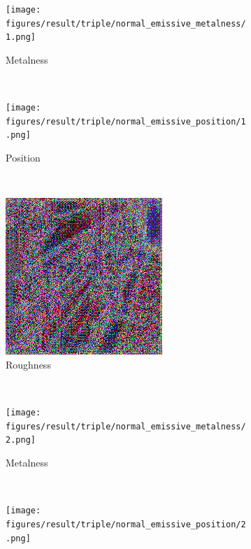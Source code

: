 \begin{figure}[h!]
    \centering
    \begin{subfigure}[b]{0.175\textwidth}
     \texttt{[image: figures/result/triple/normal\_emissive\_metalness/1.png]}
     \caption{Metalness}\label{subfig:1}
    \end{subfigure}
    ~
    \begin{subfigure}[b]{0.175\textwidth}
     \texttt{[image: figures/result/triple/normal\_emissive\_position/1.png]}
     \caption{Position}
    \end{subfigure}
    ~
    \begin{subfigure}[b]{0.175\textwidth}
     \includegraphics[width=\textwidth]{figures/result/triple/normal_emissive_roughness/1.png}
     \caption{Roughness}
    \end{subfigure}
    \\ \vspace{0.2cm} %
    \begin{subfigure}[b]{0.175\textwidth}
     \texttt{[image: figures/result/triple/normal\_emissive\_metalness/2.png]}
     \caption{Metalness}\label{subfig:1}
    \end{subfigure}
    ~
    \begin{subfigure}[b]{0.175\textwidth}
     \texttt{[image: figures/result/triple/normal\_emissive\_position/2.png]}

\end{subfigure}
\end{figure}
